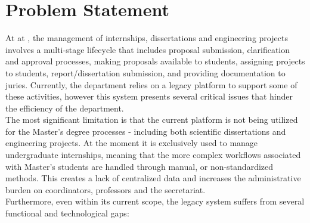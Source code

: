 \section{Problem Statement}
  \label{sec:intro_problem_statement}

  \ntindex[Template]{}
  At  at  , the management of internships, dissertations and engineering projects 
  involves a multi-stage lifecycle that includes proposal submission, clarification and approval processes, 
  making proposals available to students, assigning projects to students, report/dissertation submission, and providing documentation to juries.
  Currently, the department relies on a legacy platform to support some of these activities, however this system 
  presents several critical issues that hinder the efficiency of the department.
  \\
  The most significant limitation is that the current platform is not being utilized for the Master’s degree 
  processes - including both scientific dissertations and engineering projects. 
  At the moment it is exclusively used to manage undergraduate internships, 
  meaning that the more complex workflows associated with Master’s students are handled through manual, 
  or non-standardized methods. This creates a lack of centralized data and increases the administrative 
  burden on coordinators, professors and the secretariat.
  \\
  Furthermore, even within its current scope, the legacy system suffers from several functional and technological gaps:

